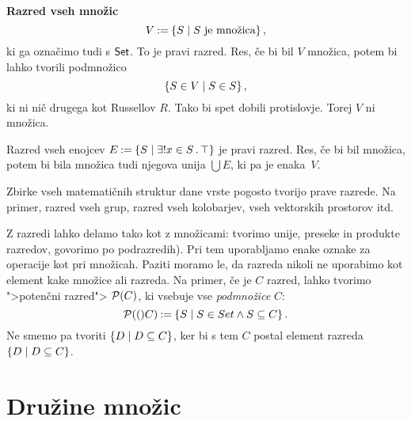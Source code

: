 \begin{primer}
  \textbf{Razred vseh množic}
  \begin{equation*}
    V \mathbin{{:}{=}} \left\{ S \; \middle| \; \text{$S$ je množica} \right\},
  \end{equation*}
% 
  ki ga označimo tudi s $\mathsf{Set}$. To je pravi razred. Res, če bi bil $V$ množica,
  potem bi lahko tvorili podmnožico
  \begin{equation*}
    \left\{ S \in V \; \middle| \; S \in S\right\},
  \end{equation*}
  ki ni nič drugega kot Russellov $R$. Tako bi spet dobili protislovje. Torej $V$
  ni množica.
\end{primer}

\begin{primer}
  Razred vseh enojcev $E \mathbin{{:}{=}} \left\{ S \; \middle| \; \exists! x \in S \,.\, \top \right\}$ je pravi razred. Res, če bi bil množica, potem bi bila množica tudi njegova unija $\bigcup E$, ki pa je enaka~$V$.
\end{primer}

\begin{primer}
  Zbirke vseh matematičnih struktur dane vrste pogosto tvorijo prave razrede. Na primer, razred vseh grup, razred vseh kolobarjev, vseh vektorskih prostorov itd.
\end{primer}

Z razredi lahko delamo tako kot z množicami: tvorimo unije, preseke in produkte
razredov, govorimo po podrazredih). Pri tem uporabljamo enake oznake za
operacije kot pri množicah. Paziti moramo le, da razreda nikoli ne uporabimo kot
element kake množice ali razreda. Na primer, če je $C$ razred, lahko tvorimo
">potenčni razred"> $\mathcal{P}(C)$, ki vsebuje vse \emph{podmnožice} $C$:
\begin{equation*}
    \mathcal{P}(()C) \mathbin{{:}{=}} \left\{ S \; \middle| \; S \in Set \land S \subseteq C \right\}.
\end{equation*}
%
Ne smemo pa tvoriti $\left\{ D \; \middle| \; D \subseteq C \right\}$, ker bi s tem $C$ postal element razreda $\left\{D \; \middle| \; D \subseteq C\right\}$.

\section{Družine množic}

